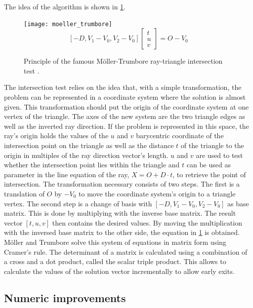 The idea of the algorithm is shown in \cref{fig:ray_triangle_intersect}.
%
\begin{figure}
	\centering
	\texttt{[image: moeller\_trumbore]}
	\begin{equation*}
		\left[-D, V_1 - V_0, V_2 - V_0 \right] \left[ \begin{array}{c} t \\ u \\ v \end{array} \right] = O - V_0
	\end{equation*}
	\caption{
		Principle of the famous Möller-Trumbore ray-triangle intersection test \cite{enlight_demo_workshop}.
	}
	\label{fig:ray_triangle_intersect}
\end{figure}
%
The intersection test relies on the idea that, with a simple transformation, the problem can be represented in a coordinate system where the solution is almost given.
This transformation should put the origin of the coordinate system at one vertex of the triangle.
The axes of the new system are the two triangle edges as well as the inverted ray direction.
If the problem is represented in this space, the ray's origin holds the values of the $u$ and $v$ barycentric coordinate of the intersection point on the triangle as well as the distance $t$ of the triangle to the origin in multiples of the ray direction vector's length.
$u$ and $v$ are used to test whether the intersection point lies within the triangle and $t$ can be used as parameter in the line equation of the ray, $X = O + D \cdot t$, to retrieve the point of intersection.
The transformation necessary consists of two steps.
The first is a translation of $O$ by $-V_0$ to move the coordinate system's origin to a triangle vertex.
The second step is a change of basis with $\left[-D, V_1 - V_0, V_2 - V_0 \right]$ as base matrix.
This is done by multiplying with the inverse base matrix.
The result vector $\left[ t,  u,  v \right]$ then contains the desired values.
By moving the multiplication with the inversed base matrix to the other side, the equation in \cref{fig:ray_triangle_intersect} is obtained.
Möller and Trumbore solve this system of equations in matrix form using Cramer's rule.
The determinant of a matrix is calculated using a combination of a cross and a dot product, called the scalar triple product.
This allows to calculate the values of the solution vector incrementally to allow early exits.


\subsection{Numeric improvements}
\label{sec:numeric_improvements}

